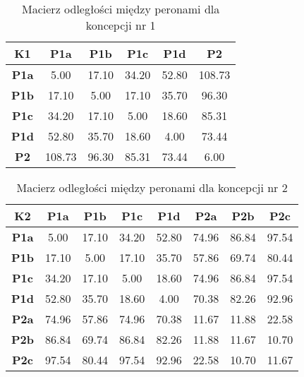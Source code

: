 \documentclass[twoside,12pt]{article}
\begin{document}
     \begin{table}[H]
       \centering
       \caption{Macierz odległości między peronami dla koncepcji nr 1}
     \begin{tabular}{|c|c|c|c|c|c|}
     \toprule
     K1         & \textbf{P1a} & \textbf{P1b} & \textbf{P1c} & \textbf{P1d} & \textbf{P2} \\
     \midrule
     \textbf{P1a} & 5.00       & 17.10      & 34.20      & 52.80      & 108.73 \\
     \midrule
     \textbf{P1b} & 17.10      & 5.00       & 17.10      & 35.70      & 96.30 \\
     \midrule
     \textbf{P1c} & 34.20      & 17.10      & 5.00       & 18.60      & 85.31 \\
     \midrule
     \textbf{P1d} & 52.80      & 35.70      & 18.60      & 4.00       & 73.44 \\
     \midrule
     \textbf{P2} & 108.73     & 96.30      & 85.31      & 73.44      & 6.00 \\
     \bottomrule
     \end{tabular}%

         
       \label{konc1_odl}
     \end{table}%
     
     \begin{table}[H]
       \centering
       \caption{Macierz odległości między peronami dla koncepcji nr 2}
     \begin{tabular}{|c|c|c|c|c|c|c|c|}
     \toprule
     K2         & \textbf{P1a} & \textbf{P1b} & \textbf{P1c} & \textbf{P1d} & \textbf{P2a} & \textbf{P2b} & \textbf{P2c} \\
     \midrule
     \textbf{P1a} & 5.00       & 17.10      & 34.20      & 52.80      & 74.96      & 86.84      & 97.54 \\
     \midrule
     \textbf{P1b} & 17.10      & 5.00       & 17.10      & 35.70      & 57.86      & 69.74      & 80.44 \\
     \midrule
     \textbf{P1c} & 34.20      & 17.10      & 5.00       & 18.60      & 74.96      & 86.84      & 97.54 \\
     \midrule
     \textbf{P1d} & 52.80      & 35.70      & 18.60      & 4.00       & 70.38      & 82.26      & 92.96 \\
     \midrule
     \textbf{P2a} & 74.96      & 57.86      & 74.96      & 70.38      & 11.67      & 11.88      & 22.58 \\
     \midrule
     \textbf{P2b} & 86.84      & 69.74      & 86.84      & 82.26      & 11.88      & 11.67      & 10.70 \\
     \midrule
     \textbf{P2c} & 97.54      & 80.44      & 97.54      & 92.96      & 22.58      & 10.70      & 11.67 \\
     \bottomrule
     \end{tabular}%

         
       \label{konc2_odl}
     \end{table}%
     
\end{document}
